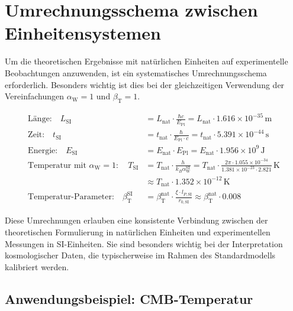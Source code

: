 \documentclass[12pt,a4paper]{article}
\newcommand{\betaT}{\beta_{\text{T}}}
\newcommand{\alphaW}{\alpha_{\text{W}}}
\begin{document}
	\section{Umrechnungsschema zwischen Einheitensystemen}
	
	Um die theoretischen Ergebnisse mit natürlichen Einheiten auf experimentelle Beobachtungen anzuwenden, ist ein systematisches Umrechnungsschema erforderlich. Besonders wichtig ist dies bei der gleichzeitigen Verwendung der Vereinfachungen \(\alphaW = 1\) und \(\betaT = 1\).
	
	\begin{tcolorbox}[colback=blue!5!white,colframe=blue!75!black,title=Umrechnungsschema zwischen Einheitensystemen]
		\begin{align}
			\text{Länge:} \quad L_{\text{SI}} &= L_{\text{nat}} \cdot \frac{\hbar c}{E_{\text{Pl}}} = L_{\text{nat}} \cdot 1.616 \times 10^{-35} \, \text{m} \\
			\text{Zeit:} \quad t_{\text{SI}} &= t_{\text{nat}} \cdot \frac{\hbar}{E_{\text{Pl}} \cdot c} = t_{\text{nat}} \cdot 5.391 \times 10^{-44} \, \text{s} \\
			\text{Energie:} \quad E_{\text{SI}} &= E_{\text{nat}} \cdot E_{\text{Pl}} = E_{\text{nat}} \cdot 1.956 \times 10^9 \, \text{J} \\
			\text{Temperatur mit } \alphaW = 1: \quad T_{\text{SI}} &= T_{\text{nat}} \cdot \frac{h}{k_B \alphaW^{\text{SI}}} = T_{\text{nat}} \cdot \frac{2\pi \cdot 1.055 \times 10^{-34}}{1.381 \times 10^{-23} \cdot 2.821} \, \text{K} \\
			&\approx T_{\text{nat}} \cdot 1.352 \times 10^{-12} \, \text{K} \\
			\text{Temperatur-Parameter:} \quad \betaT^{\text{SI}} &= \betaT^{\text{nat}} \cdot \frac{\xi \cdot l_{P,\text{SI}}}{r_{0,\text{SI}}} \approx \betaT^{\text{nat}} \cdot 0.008
		\end{align}
	\end{tcolorbox}
	
	Diese Umrechnungen erlauben eine konsistente Verbindung zwischen der theoretischen Formulierung in natürlichen Einheiten und experimentellen Messungen in SI-Einheiten. Sie sind besonders wichtig bei der Interpretation kosmologischer Daten, die typischerweise im Rahmen des Standardmodells kalibriert werden.
	
	\subsection{Anwendungsbeispiel: CMB-Temperatur}
	
\end{document}
